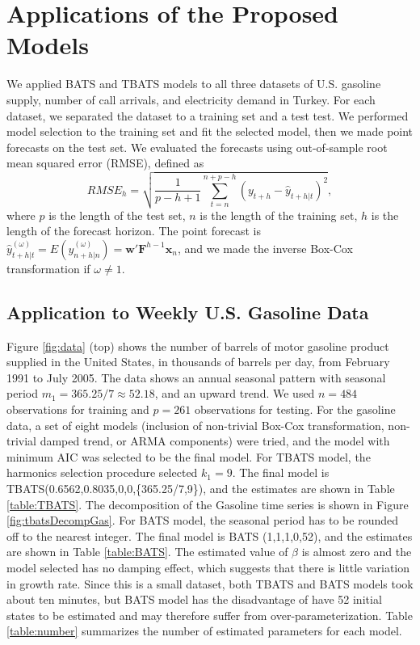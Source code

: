 \documentclass{uwstat572}
\begin{document}
\section{Applications of the Proposed Models}
\hspace{4ex}We applied BATS and TBATS models to all three datasets of U.S. gasoline supply, number of call arrivals, and electricity demand in Turkey. For each dataset, we separated the dataset to a training set and a test test. We performed model selection to the training set and fit the selected model, then we made point forecasts on the test set. We evaluated the forecasts using out-of-sample root mean squared error (RMSE), defined as
\begin{equation}
RMSE_h=\sqrt{\frac{1}{p-h+1} \sum\limits_{t=n}^{n+p-h} (y_{t+h}-\hat{y}_{t+h|t})^2},
\end{equation} 
\noindent where $p$ is the length of the test set, $n$ is the length of the training set, $h$ is the length of the forecast horizon. The point forecast is $\hat{y}_{t+h|t}^{(\omega)}=E(y_{n+h|n}^{(\omega)})= \textbf{w}'\textbf{F}^{h-1} \textbf{x}_n$, and we made the inverse Box-Cox transformation if $\omega \neq1$. 

\subsection{Application to Weekly U.S. Gasoline Data}
\hspace{4ex}Figure \ref{fig:data} (top) shows the number of barrels of motor gasoline product supplied in the United States, in thousands of barrels per day, from February 1991 to July 2005. The data shows an annual seasonal pattern with seasonal period $m_1=365.25/7 \approx 52.18$, and an upward trend. We used $n=484$ observations for training and $p=261$ observations for testing. For the gasoline data, a set of eight models (inclusion of non-trivial Box-Cox transformation, non-trivial damped trend, or ARMA components) were tried, and the model with minimum AIC was selected to be the final model.  For TBATS model, the harmonics selection procedure selected $k_1=9$. The final model is TBATS(0.6562,0.8035,0,0,\{365.25/7,9\}), and the estimates are shown in Table \ref{table:TBATS}. The decomposition of the Gasoline time series is shown in Figure \ref{fig:tbatsDecompGas}. For BATS model, the seasonal period has to be rounded off to the nearest integer. The final model is BATS (1,1,1,0,52), and the estimates are shown in Table \ref{table:BATS}. The estimated value of $\beta$ is almost zero and the model selected has no damping effect, which suggests that there is little variation in growth rate. Since this is a small dataset, both TBATS and BATS models took about ten minutes, but BATS model has the disadvantage of have 52 initial states to be estimated and may therefore suffer from over-parameterization. Table \ref{table:number} summarizes the number of estimated parameters for each model.
\end{document}

